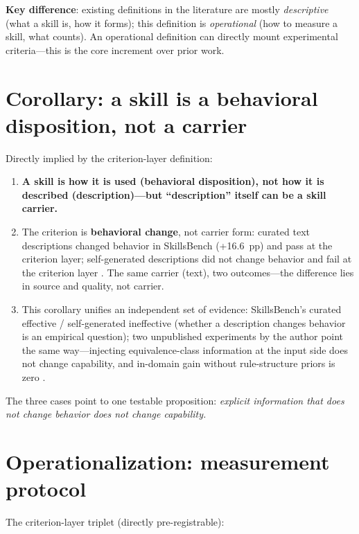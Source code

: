 \documentclass[11pt]{article}
\begin{document}
\textbf{Key difference}: existing definitions in the literature are mostly \emph{descriptive} (what a skill is, how it forms); this definition is \emph{operational} (how to measure a skill, what counts). An operational definition can directly mount experimental criteria---this is the core increment over prior work.

\section{Corollary: a skill is a behavioral disposition, not a carrier}
\label{sec:corollary}

Directly implied by the criterion-layer definition:

\begin{enumerate}
\item \textbf{A skill is how it is used (behavioral disposition), not how it is described (description)---but ``description'' itself can be a skill carrier.}
\item The criterion is \textbf{behavioral change}, not carrier form: curated text descriptions changed behavior in SkillsBench (+16.6~pp) and pass at the criterion layer; self-generated descriptions did not change behavior and fail at the criterion layer \cite{skillsbench}. The same carrier (text), two outcomes---the difference lies in source and quality, not carrier.
\item This corollary unifies an independent set of evidence: SkillsBench's curated effective / self-generated ineffective (whether a description changes behavior is an empirical question); two unpublished experiments by the author point the same way---injecting equivalence-class information at the input side does not change capability, and in-domain gain without rule-structure priors is zero \cite{repo}.
\end{enumerate}

The three cases point to one testable proposition: \emph{explicit information that does not change behavior does not change capability.}

\section{Operationalization: measurement protocol}
\label{sec:operationalization}

The criterion-layer triplet (directly pre-registrable):
\end{document}
